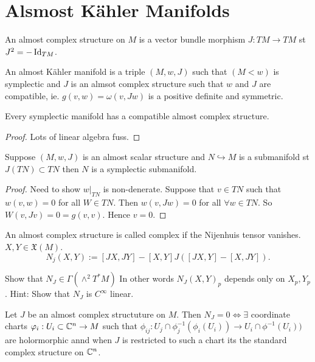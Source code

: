 \section{Alsmost K\"ahler Manifolds} \label{sec:alsmost_kahler_manifolds}
\begin{definition}
	An almost complex structure on $M$ is a vector bundle morphism $J: TM \to TM$ st $J^2 = -\operatorname{Id}_{TM}$. 
\end{definition}
\begin{definition}
	An almost K\"ahler manifold is a triple  $(M, w, J)$ such that $(M< w)$ is symplectic and  $J$ is an almsot complex structure such that $w $ and $J$ are compatible, ie. $g(v, w) = \omega(v, Jw)$ 
is a positive definite and symmetric.
\end{definition}
\begin{remark}
	Every symplectic manifold has a compatible almost complex structure.	
\end{remark}
\begin{proof}
	Lots of linear algebra fuss.
\end{proof}

\begin{proposition}
	Suppose $(M, w, J)$ is an almost scalar structure and $N \hookrightarrow M$ is a submanifold st $J(TN) \subset TN$ then $N$ is a symplectic submanifold. 
\end{proposition}
\begin{proof}
	Need to show $w|_{TN} $ is non-denerate. Suppose that $v \in TN$ such that $w(v, w) = 0$ for all $W \in TN$. 
	Then $w(v, Jw) = 0$ for all $\forall w \in TN$. 
	So $W(v, Jv) = 0 = g(v,v) $. Hence  $v = 0$.
\end{proof}
\begin{definition}
	An almost complex structure is called complex if the Nijenhuis tensor vanishes. 
	$X, Y \in \mathfrak{X} (M)$.
	\[
		N_j(X, Y):= [JX, JY] - [X,Y] J([JX, Y] - [X, JY])
	.\] 
\end{definition}
\begin{exercise}
Show that $N_J \in \Gamma (\wedge^2 T^* M)$ In other words $N_J(X,Y)_p$ depends only on $X_p, Y_p$.
Hint: Show that $N_J$ is $C^{\infty}$ linear.
\end{exercise}
\begin{theorem}
	Let $J$ be an almost complex structuture on $M$. Then $N_J = 0 \iff \exists $ coordinate charts $\varphi_i: U_i \subset \mathbb{C}^{n}\to M$ such that $\phi_{ij}: U_{j}\cap \phi^{-1}_j(\phi_i(U_i)) \to U_i \cap \phi^{-1} (U_i))$ are holormorphic annd when $J$ is restricted to such a chart its the standard complex structure on $\mathbb{C}^{n}$. 
\end{theorem}

